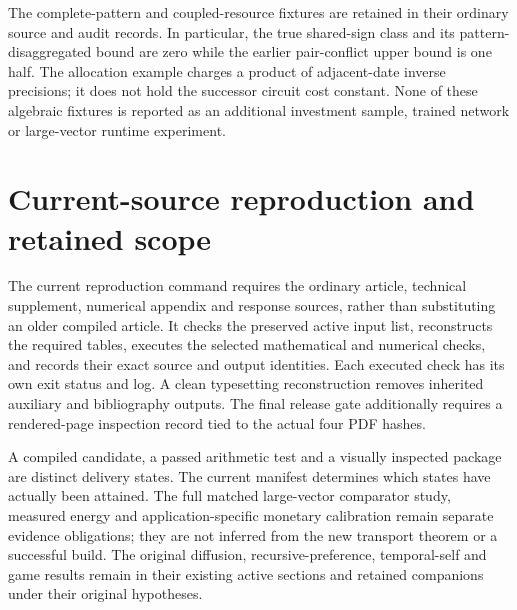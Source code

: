 The complete-pattern and coupled-resource fixtures are retained in their ordinary source and audit records. In particular, the true shared-sign class and its pattern-disaggregated bound are zero while the earlier pair-conflict upper bound is one half. The allocation example charges a product of adjacent-date inverse precisions; it does not hold the successor circuit cost constant. None of these algebraic fixtures is reported as an additional investment sample, trained network or large-vector runtime experiment.

\section{Current-source reproduction and retained scope}\label{app:delivery90}
The current reproduction command requires the ordinary article, technical supplement, numerical appendix and response sources, rather than substituting an older compiled article. It checks the preserved active input list, reconstructs the required tables, executes the selected mathematical and numerical checks, and records their exact source and output identities. Each executed check has its own exit status and log. A clean typesetting reconstruction removes inherited auxiliary and bibliography outputs. The final release gate additionally requires a rendered-page inspection record tied to the actual four PDF hashes.

A compiled candidate, a passed arithmetic test and a visually inspected package are distinct delivery states. The current manifest determines which states have actually been attained. The full matched large-vector comparator study, measured energy and application-specific monetary calibration remain separate evidence obligations; they are not inferred from the new transport theorem or a successful build. The original diffusion, recursive-preference, temporal-self and game results remain in their existing active sections and retained companions under their original hypotheses.
